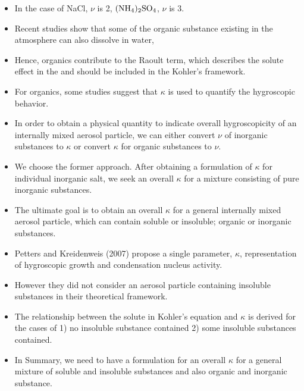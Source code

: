 \documentclass[12pt]{article}
\begin{document}
{\begin{itemize}
\item  In the case of NaCl, $\nu$ is 2, $\rm (NH_4)_2SO_4$, $\nu$ is 3.

\item Recent studies show that some of the organic substance existing in the atmosphere can also dissolve in water,

\item Hence, organics contribute to the Raoult term, which describes the solute effect in the and should be included in the Kohler's  framework. 

\item For organics, some studies suggest that $\kappa$ is used to quantify the hygroscopic behavior. 


\item In order to obtain a physical quantity to indicate overall hygroscopicity of an internally mixed aerosol particle, we can either convert $\nu$ of inorganic substances to $\kappa$ or convert $\kappa$ for organic substances to $\nu$. 


\item We choose the former approach. After obtaining a formulation of $\kappa$ for individual inorganic salt, we seek an overall $\kappa$ for a mixture consisting of pure inorganic substances. 

\item The ultimate goal is to obtain an overall $\kappa$ for a general internally mixed aerosol particle, which can contain soluble or insoluble; organic or inorganic substances.

\item Petters and Kreidenweis (2007) propose a single parameter, $\kappa$, representation of hygroscopic growth and condensation nucleus activity.

\item However they did not consider an aerosol particle containing insoluble substances in their theoretical framework.

\item The relationship between the solute in Kohler's equation and $\kappa$ is derived for the cases of 1) no insoluble substance contained 2) some insoluble substances contained.  

\item In Summary, we need to have a formulation for an overall $\kappa$ for a general mixture of soluble and insoluble substances and also organic and inorganic substance. 
 
\end{itemize}

}
\end{document}
